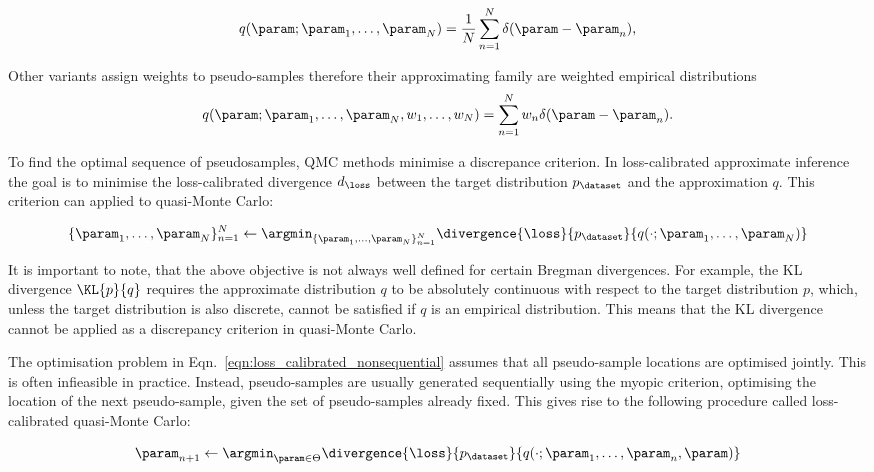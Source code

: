 \begin{equation}
	q(\param ; \param_1,\ldots,\param_N) = \frac{1}{N} \sum_{n=1}^{N} \delta(\param - \param_n)\mbox{,}
\end{equation}

Other variants assign weights to pseudo-samples therefore their approximating family are weighted empirical distributions
\begin{equation}
	q(\param ; \param_1,\ldots,\param_N,w_1,\ldots,w_N) = \sum_{n=1}^{N} w_n \delta(\param - \param_n)\mbox{.}
\end{equation}

To find the optimal sequence of pseudosamples, QMC methods minimise a discrepance criterion. In loss-calibrated approximate inference the goal is to minimise the loss-calibrated divergence $d_\loss$ between the target distribution $p_\dataset$ and the approximation $q$. This criterion can applied to quasi-Monte Carlo:

\begin{equation}
	\{\param_1,\ldots,\param_N\}_{n=1}^{N} \leftarrow \argmin_{\{\param_1,\ldots,\param_N\}_{n=1}^{N}} \divergence{\loss}{p_\dataset}{q(\cdot ; \param_1,\ldots,\param_N)} \label{eqn:loss_calibrated_nonsequential}
\end{equation}

It is important to note, that the above objective is not always well defined for certain Bregman divergences. For example, the KL divergence $\KL{p}{q}$ requires the approximate distribution $q$ to be absolutely continuous with respect to the target distribution $p$, which, unless the target distribution is also discrete, cannot be satisfied if $q$ is an empirical distribution. This means that the KL divergence cannot be applied as a discrepancy criterion in quasi-Monte Carlo.

The optimisation problem in Eqn.\ \ref{eqn:loss_calibrated_nonsequential} assumes that all pseudo-sample locations are optimised jointly. This is often infieasible in practice. Instead, pseudo-samples are usually generated sequentially using the myopic criterion, optimising the location of the next pseudo-sample, given the set of pseudo-samples already fixed. This gives rise to the following procedure called loss-calibrated quasi-Monte Carlo:

\begin{equation}
	\param_{n+1} \leftarrow \argmin_{\param \in \Theta} \divergence{\loss}{p_\dataset}{q(\cdot ; \param_1,\ldots,\param_{n},\param)} \label{eqn:loss_calibrated_sequential}
\end{equation}

